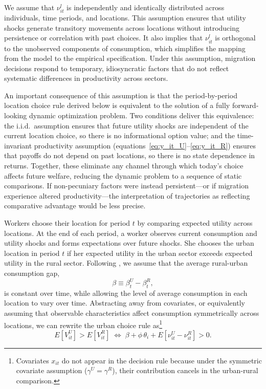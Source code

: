 \documentclass[12pt]{article}
\begin{document}
We assume that $\nu_{it}^l$ is independently and identically distributed across individuals, time periods, and locations. 
This assumption ensures that utility shocks generate transitory movements across locations without introducing persistence or correlation with past choices.
It also implies that $\nu_{it}^{l}$ is orthogonal to the unobserved components of consumption, which simplifies the mapping from the model to the empirical specification.
Under this assumption, migration decisions respond to temporary, idiosyncratic factors that do not reflect systematic differences in productivity across sectors.

An important consequence of this assumption is that the period-by-period location choice rule derived below is equivalent to the solution of a fully forward-looking dynamic optimization problem.
Two conditions deliver this equivalence: the i.i.d.\ assumption ensures that future utility shocks are independent of the current location choice, so there is no informational option value; and the time-invariant productivity assumption (equations~\ref{eq:y_it_U}--\ref{eq:y_it_R}) ensures that payoffs do not depend on past locations, so there is no state dependence in returns.
Together, these eliminate any channel through which today's choice affects future welfare, reducing the dynamic problem to a sequence of static comparisons.
If non-pecuniary factors were instead persistent---or if migration experience altered productivity---the interpretation of trajectories as reflecting comparative advantage would be less precise.

Workers choose their location for period $t$ by comparing expected utility across locations. 
At the end of each period, a worker observes current consumption and utility shocks and forms expectations over future shocks. 
She chooses the urban location in period $t$ if her expected utility in the urban sector exceeds expected utility in the rural sector. 
Following \cite{lemieuxEstimatingEffectsUnions1998}, we assume that the average rural-urban consumption gap,
\begin{equation}
    \beta \equiv \beta_t^U - \beta_t^R,\label{eq:beta}
\end{equation}
is constant over time, while allowing the level of average consumption in each location to vary over time.
Abstracting away from covariates, or equivalently assuming that observable characteristics affect consumption symmetrically across locations, we can rewrite the urban choice rule as\footnote{Covariates $x_{it}$ do not appear in the decision rule because under the symmetric covariate assumption ($\gamma^U = \gamma^R$), their contribution cancels in the urban-rural comparison.} 
\begin{equation}\label{eq:decision-rule}
    E\!\left[V_{it}^U\right] > E\!\left[V_{it}^R\right]
    \;\Longleftrightarrow\;
    \beta + \phi\,\theta_i + E\!\left[\nu_{it}^U - \nu_{it}^R\right] > 0.
\end{equation}
\end{document}
